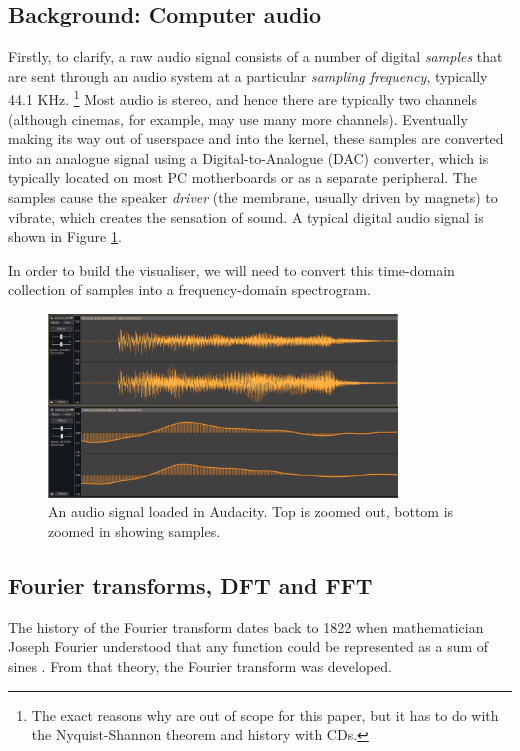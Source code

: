 \documentclass[11pt]{article}
\begin{document}
\subsection{Background: Computer audio}
Firstly, to clarify, a raw audio signal consists of a number of digital \textit{samples} that are sent through
an audio system at a particular \textit{sampling frequency}, typically 44.1 KHz.
\footnote{The exact reasons why are out of scope for this paper, but it has to do with the Nyquist-Shannon
theorem and history with CDs.}
Most audio is stereo, and hence there are typically two channels (although cinemas, for example, may use many
more channels). Eventually making its way out of userspace and into the kernel, these samples are converted
into an analogue signal using a Digital-to-Analogue (DAC) converter, which is typically located on most PC
motherboards or as a separate peripheral. The samples cause the speaker \textit{driver} (the membrane, usually
driven by magnets) to vibrate, which creates the sensation of sound. A typical digital audio signal is shown
in Figure \ref{fig:audiosignal}.

In order to build the visualiser, we will need to convert this time-domain collection of samples into a
frequency-domain spectrogram.

\begin{figure}[H]
\centering
\includegraphics[width=350px]{img/audiosignal.png}
\caption{An audio signal loaded in Audacity. Top is zoomed out, bottom is zoomed in showing samples.}
\label{fig:audiosignal}
\end{figure}

\subsection{Fourier transforms, DFT and FFT}
The history of the Fourier transform dates back to 1822 when mathematician Joseph Fourier understood that any
function could be represented as a sum of sines \cite{wolframFourierSeries}. From that theory, the Fourier
transform was developed.
\end{document}
